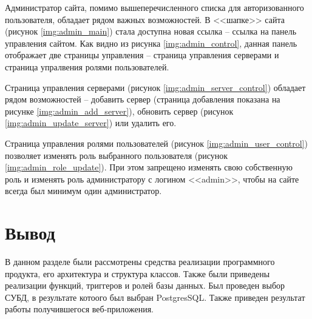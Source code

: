 Администратор сайта, помимо вышеперечисленного списка для авторизованного пользователя, обладает рядом важных возможностей. В <<шапке>> сайта (рисунок \ref{img:admin_main}) стала доступна новая ссылка -- ссылка на панель управления сайтом. Как видно из рисунка \ref{img:admin_control}, данная панель отображает две страницы управления -- страница управления серверами и страница упралвения ролями пользователей.

Страница управления серверами (рисунок \ref{img:admin_server_control}) обладает рядом возможностей -- добавить сервер (страница добавления показана на рисунке \ref{img:admin_add_server}), обновить сервер (рисунок \ref{img:admin_update_server}) или удалить его.

Страница управления ролями пользователей (рисунок \ref{img:admin_user_control}) позволяет изменять роль выбранного пользователя (рисунок \ref{img:admin_role_update}). При этом запрещено изменять свою собственную роль и изменять роль администратору с логином <<admin>>, чтобы на сайте всегда был минимум один администратор.



\clearpage

\section{Вывод}

В данном разделе были рассмотрены средства реализации программного продукта, его архитектура и структура классов. Также были приведены реализации функций, триггеров и ролей базы данных. Был проведен выбор СУБД, в результате котоого был выбран PostgresSQL. Также приведен результат работы получившегося веб-приложения. 

